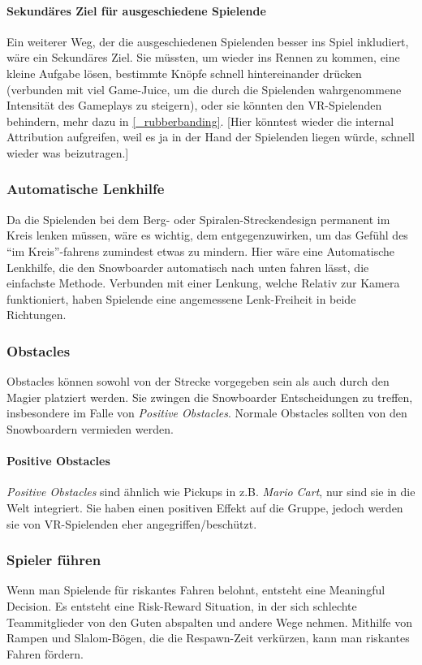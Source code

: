 \paragraph{Sekundäres Ziel für ausgeschiedene Spielende}
Ein weiterer Weg, der die ausgeschiedenen Spielenden besser ins Spiel inkludiert, wäre ein Sekundäres Ziel. Sie müssten, um wieder ins Rennen zu kommen, eine kleine Aufgabe lösen, bestimmte Knöpfe schnell hintereinander drücken (verbunden mit viel Game-Juice, um die durch die Spielenden wahrgenommene Intensität des Gameplays zu steigern), oder sie könnten den VR-Spielenden behindern, mehr dazu in \ref{_rubberbanding}. [Hier könntest wieder die internal Attribution aufgreifen, weil es ja in der Hand der Spielenden liegen würde, schnell wieder was beizutragen.]

\subsubsection{Automatische Lenkhilfe}
Da die Spielenden bei dem Berg- oder Spiralen-Streckendesign permanent im Kreis lenken müssen, wäre es wichtig, dem entgegenzuwirken, um das Gefühl des "`im Kreis"'-fahrens zumindest etwas zu mindern. Hier wäre eine Automatische Lenkhilfe, die den Snowboarder automatisch nach unten fahren lässt, die einfachste Methode. Verbunden mit einer Lenkung, welche Relativ zur Kamera funktioniert, haben Spielende eine angemessene Lenk-Freiheit in beide Richtungen.

\subsubsection{Obstacles}
Obstacles können sowohl von der Strecke vorgegeben sein als auch durch den Magier platziert werden. Sie zwingen die Snowboarder Entscheidungen zu treffen, insbesondere im Falle von \emph{Positive Obstacles}. Normale Obstacles sollten von den Snowboardern vermieden werden.

\paragraph{Positive Obstacles\label{_positive_obstacles}}
\emph{Positive Obstacles} sind ähnlich wie Pickups in z.B. \emph{Mario Cart}, nur sind sie in die Welt integriert. Sie haben einen positiven Effekt auf die Gruppe, jedoch werden sie von VR-Spielenden eher angegriffen/beschützt.

\subsubsection{Spieler führen}
Wenn man Spielende für riskantes Fahren belohnt, entsteht eine Meaningful Decision. Es entsteht eine Risk-Reward Situation, in der sich schlechte Teammitglieder von den Guten abspalten und andere Wege nehmen. Mithilfe von Rampen und Slalom-Bögen, die die Respawn-Zeit verkürzen, kann man riskantes Fahren fördern.


